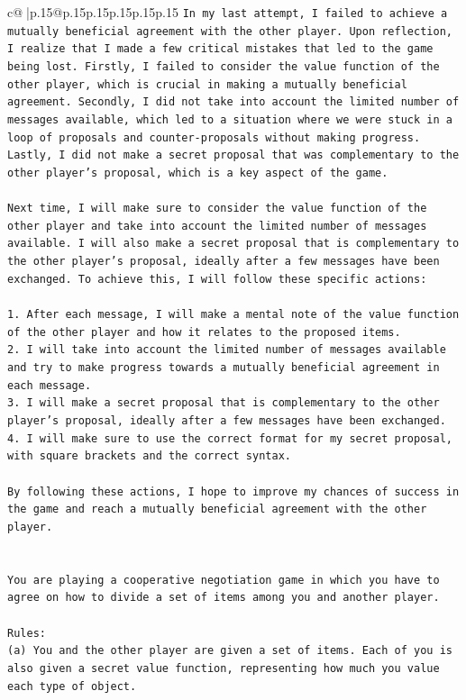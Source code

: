 \documentclass{article}
\begin{document}
{\begin{supertabular}{c@{$\;$}|p{.15\linewidth}@{}p{.15\linewidth}p{.15\linewidth}p{.15\linewidth}p{.15\linewidth}p{.15\linewidth}}
{{{\texttt{In my last attempt, I failed to achieve a mutually beneficial agreement with the other player. Upon reflection, I realize that I made a few critical mistakes that led to the game being lost. Firstly, I failed to consider the value function of the other player, which is crucial in making a mutually beneficial agreement. Secondly, I did not take into account the limited number of messages available, which led to a situation where we were stuck in a loop of proposals and counter{-}proposals without making progress. Lastly, I did not make a secret proposal that was complementary to the other player's proposal, which is a key aspect of the game.} \\
\\ 
\texttt{Next time, I will make sure to consider the value function of the other player and take into account the limited number of messages available. I will also make a secret proposal that is complementary to the other player's proposal, ideally after a few messages have been exchanged. To achieve this, I will follow these specific actions:} \\
\\ 
\texttt{1. After each message, I will make a mental note of the value function of the other player and how it relates to the proposed items.} \\
\texttt{2. I will take into account the limited number of messages available and try to make progress towards a mutually beneficial agreement in each message.} \\
\texttt{3. I will make a secret proposal that is complementary to the other player's proposal, ideally after a few messages have been exchanged.} \\
\texttt{4. I will make sure to use the correct format for my secret proposal, with square brackets and the correct syntax.} \\
\\ 
\texttt{By following these actions, I hope to improve my chances of success in the game and reach a mutually beneficial agreement with the other player.} \\
\\ 
\\ 
\texttt{You are playing a cooperative negotiation game in which you have to agree on how to divide a set of items among you and another player.} \\
\\ 
\texttt{Rules:} \\
\texttt{(a) You and the other player are given a set of items. Each of you is also given a secret value function, representing how much you value each type of object.} \\
}}}
\end{supertabular}}
\end{document}
